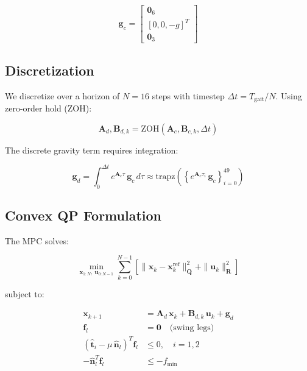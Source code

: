 \documentclass[11pt,a4paper]{article}
\begin{document}
\begin{equation}
\mathbf{g}_c = \begin{bmatrix} \mathbf{0}_6 \\ [0, 0, -g]^T \\ \mathbf{0}_3 \end{bmatrix}
\end{equation}

\subsection{Discretization}

We discretize over a horizon of $N = 16$ steps with timestep $\Delta t = T_{\text{gait}}/N$. Using zero-order hold (ZOH):

\begin{equation}
\mathbf{A}_d, \mathbf{B}_{d,k} = \text{ZOH}(\mathbf{A}_c, \mathbf{B}_{c,k}, \Delta t)
\end{equation}

The discrete gravity term requires integration:

\begin{equation}
\mathbf{g}_d = \int_0^{\Delta t} e^{\mathbf{A}_c \tau}\,\mathbf{g}_c\,d\tau \approx \text{trapz}\!\left(\left\{e^{\mathbf{A}_c \tau_i}\,\mathbf{g}_c\right\}_{i=0}^{49}\right)
\end{equation}

\subsection{Convex QP Formulation}

The MPC solves:

\begin{equation}
\min_{\mathbf{x}_{1:N},\, \mathbf{u}_{0:N-1}} \sum_{k=0}^{N-1}\left[\|\mathbf{x}_k - \mathbf{x}_k^{\text{ref}}\|_{\mathbf{Q}}^2 + \|\mathbf{u}_k\|_{\mathbf{R}}^2\right]
\end{equation}

subject to:

\begin{align}
\mathbf{x}_{k+1} &= \mathbf{A}_d\,\mathbf{x}_k + \mathbf{B}_{d,k}\,\mathbf{u}_k + \mathbf{g}_d \\
\mathbf{f}_l &= \mathbf{0} \quad \text{(swing legs)} \\
(\hat{\mathbf{t}}_i - \mu\,\hat{\mathbf{n}}_l)^T \mathbf{f}_l &\leq 0, \quad i = 1, 2 \\
-\hat{\mathbf{n}}_l^T \mathbf{f}_l &\leq -f_{\min}
\end{align}
\end{document}
